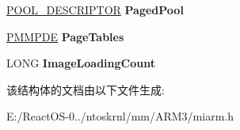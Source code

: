 \begin{DoxyCompactItemize}
\item 
\mbox{\label{struct___m_m___s_e_s_s_i_o_n___s_p_a_c_e_ac891ae560613fc80ded0a0234013aaad}} 
\hyperlink{struct___p_o_o_l___d_e_s_c_r_i_p_t_o_r}{P\+O\+O\+L\+\_\+\+D\+E\+S\+C\+R\+I\+P\+T\+OR} {\bfseries Paged\+Pool}
\item 
\mbox{\label{struct___m_m___s_e_s_s_i_o_n___s_p_a_c_e_a26d06cf083ae866f9cf9da2946253aba}} 
\hyperlink{struct___m_m_p_t_e}{P\+M\+M\+P\+DE} {\bfseries Page\+Tables}
\item 
\mbox{\label{struct___m_m___s_e_s_s_i_o_n___s_p_a_c_e_a723338bb2af24eb2c9517913ccebce3f}} 
L\+O\+NG {\bfseries Image\+Loading\+Count}
\end{DoxyCompactItemize}


该结构体的文档由以下文件生成\+:\begin{DoxyCompactItemize}
\item 
E\+:/\+React\+O\+S-\/0../ntoskrnl/mm/\+A\+R\+M3/miarm.\+h\end{DoxyCompactItemize}
